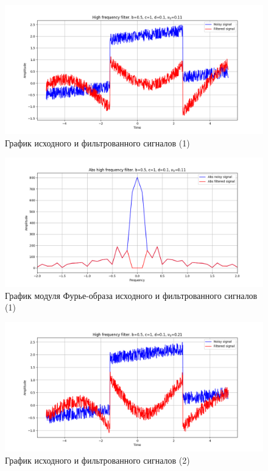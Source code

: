 \documentclass[a4paper, 12pt]{article}
\begin{document}
    \begin{figure}[!htb]
        \centering
        \includegraphics[scale=0.48]{1_u_flt_u_nolow.png}
        \captionsetup{skip=0pt}
        \caption{График исходного и фильтрованного сигналов (1)}
        \label{fig:fig27}
    \end{figure}
    \newpage
    \begin{figure}[!htb]
        \centering
        \includegraphics[scale=0.48]{1_abs_u_U_nolow.png}
        \captionsetup{skip=0pt}
        \caption{График модуля Фурье-образа исходного и фильтрованного сигналов (1)}
        \label{fig:fig28}
    \end{figure}
    \begin{figure}[!htb]
        \centering
        \includegraphics[scale=0.48]{2_u_flt_u_nolow.png}
        \captionsetup{skip=0pt}
        \caption{График исходного и фильтрованного сигналов (2)}
        \label{fig:fig29}
    \end{figure}
\end{document}
